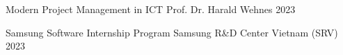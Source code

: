 

\begin{cvhonors}

  \cvhonor
    {Modern Project Management in ICT} %
    {Prof. Dr. Harald Wehnes} %
    {} %
    {2023} %

  \cvhonor
    {Samsung Software Internship Program} %
    {Samsung R\&D Center Vietnam (SRV)} %
    {} %
    {2023} %

\end{cvhonors}
